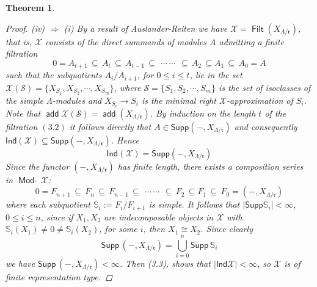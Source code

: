 \documentclass[oneside, a4paper,reqno]{amsart}
\numberwithin{equation}{section}
\newtheorem{thm}{Theorem}[section]
\theoremstyle{definition}
\begin{document}
\begin{thm}
\begin{proof}
(iv) $\Rightarrow$ (i) By a result of Auslander-Reiten
\cite{AR:applications} we have ${\mathcal X} =
\operatorname*{\mathsf{Filt}}(X_{\Lambda/\mathfrak{r}})$, that is, ${\mathcal X}$  consists of the
direct summands of modules $A$ admitting  a finite filtration
\begin{equation}
 0 = A_{t+1}\, \subseteq\, A_{t} \, \subseteq\, A_{t-1}\, \subseteq \,\
 \cdots \,
 \cdots \,\
 \subseteq \, A_{2}\, \subseteq A_{1} \, \subseteq\, A_{0} = A
\end{equation}
such that the subquotients $A_{i}/A_{i+1}$, for $0\leq i \leq t$,
lie in the set ${\mathcal X}(\mathcal S) =
\{X_{S_{1}},X_{S_{2}},\cdots,X_{S_{m}}\}$, where $\mathcal S =
\{S_{1},S_{2},\cdots,S_{m}\}$ is the set of isoclasses of the simple
$\Lambda$-modules and $X_{S_{i}} {\longrightarrow} S_{i}$ is the minimal right
${\mathcal X}$-approximation of $S_{i}$. Note that $\operatorname*{\mathsf{add}}{\mathcal X}(\mathcal S) =
\operatorname*{\mathsf{add}}(X_{\Lambda/\mathfrak{r}})$.  By induction on the length $t$ of
the filtration $(3.2)$ it follows directly that $A \in
\mathsf{Supp}(-,X_{\Lambda/\mathfrak{r}})$ and consequently $\mathsf{Ind}({\mathcal X})
\subseteq \mathsf{Supp}(-,X_{\Lambda/\mathfrak{r}})$. Hence
\begin{equation}
\mathsf{Ind}({\mathcal X}) = \mathsf{Supp}(-,X_{\Lambda/\mathfrak{r}})
\end{equation}
Since the functor $(-,X_{\Lambda/\mathfrak{r}})$ has finite length,
there exists a composition series in $\operatorname*{\mathsf{Mod}-\!}{\mathcal X}$:
\begin{equation}
0 = F_{n+1} \, \subseteq\, F_{n} \, \subseteq\, F_{n-1}\, \subseteq
\,\ \cdots\,
 \cdots \,\
 \subseteq \, F_{2} \, \subseteq F_{1}\, \subseteq \, F_{0} = (-,X_{\Lambda/\mathfrak{r}})
\end{equation}
where each subquotient $\mathbb S_{i} := F_{i}/F_{i+1}$ is simple.
It follows that $|\mathsf{Supp}\mathbb S_{i}| < \infty$, $0\leq i
\leq n$, since if $X_{1}, X_{2}$ are indecomposable objects in ${\mathcal X}$
with $\mathbb S_{i}(X_{1}) \neq 0 \neq \mathbb S_{i}(X_{2})$,
for some $i$, then $X_{1} \cong X_{2}$. Since clearly
\begin{equation}
\mathsf{Supp}\,(-,X_{\Lambda/\mathfrak{r}}) =
\bigcup^{n}_{i=0}\mathsf{Supp}\,\mathbb S_{i}
\end{equation}
we have $\mathsf{Supp}\,(-,X_{\Lambda/\mathfrak{r}}) < \infty$. Then
(3.3), shows that $|\mathsf{Ind}{\mathcal X}| < \infty$, so ${\mathcal X}$ is of finite
representation type.


\end{proof}
\end{thm}
\end{document}
